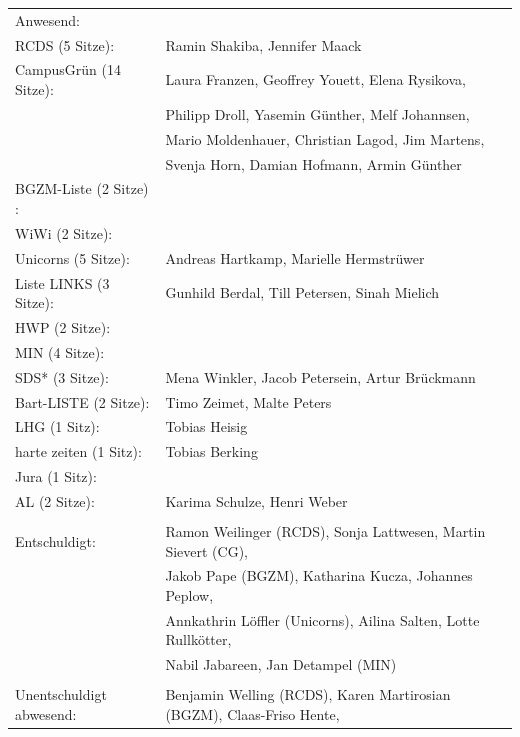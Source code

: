 \documentclass[ngerman,headheight=70pt]{scrartcl}
\begin{document}
    \begin{tabular}{ll}
        Anwesend: & \\
            RCDS (5 Sitze): & Ramin Shakiba, Jennifer Maack \\
             CampusGrün (14 Sitze): & Laura Franzen, Geoffrey Youett, Elena Rysikova, \\
                                   & Philipp Droll, Yasemin Günther, Melf Johannsen, \\
                                   & Mario Moldenhauer, Christian Lagod, Jim Martens, \\
                                   & Svenja Horn, Damian Hofmann, Armin Günther \\
             BGZM-Liste (2 Sitze) : & \\
             WiWi (2 Sitze): & \\
             Unicorns (5 Sitze): & Andreas Hartkamp, Marielle Hermstrüwer \\
             Liste LINKS (3 Sitze): & Gunhild Berdal, Till Petersen, Sinah Mielich \\
             HWP (2 Sitze): &  \\
             MIN (4 Sitze): &  \\
             SDS* (3 Sitze): & Mena Winkler, Jacob Petersein, Artur Brückmann \\
             Bart-LISTE (2 Sitze): & Timo Zeimet, Malte Peters \\
             LHG (1 Sitz): & Tobias Heisig \\
             harte zeiten (1 Sitz): & Tobias Berking \\
             Jura (1 Sitz): & \\
             AL (2 Sitze): & Karima Schulze, Henri Weber \\
            & \\
        Entschuldigt: & Ramon Weilinger (RCDS), Sonja Lattwesen, Martin Sievert (CG), \\
                      & Jakob Pape (BGZM), Katharina Kucza, Johannes Peplow, \\
                      & Annkathrin Löffler (Unicorns), Ailina Salten, Lotte Rullkötter, \\
                      & Nabil Jabareen, Jan Detampel (MIN) \\
                      &\\
        Unentschuldigt abwesend: & Benjamin Welling (RCDS), Karen Martirosian (BGZM), Claas-Friso Hente,\\

\end{tabular}
\end{document}
